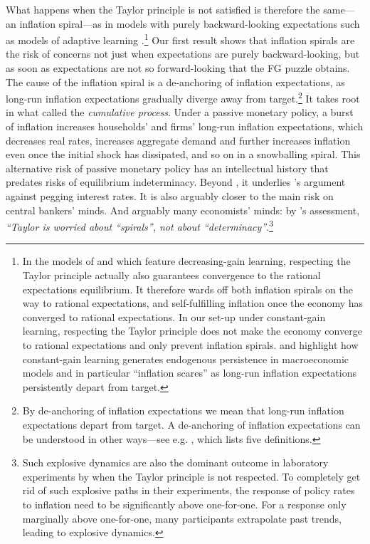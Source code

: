 \documentclass{article}
\begin{document}
What happens when the Taylor principle is not satisfied is therefore the same---an inflation spiral---as in models with purely backward-looking expectations such as models of adaptive learning \citep{BullardMitra2002,EvansHonkapohja2003, Preston2005}.\footnote{In the models of \cite{BullardMitra2002} and \cite{Preston2005} which feature decreasing-gain learning, respecting the Taylor principle actually also guarantees convergence to the rational expectations equilibrium. It therefore wards off both inflation spirals on the way to rational expectations, and self-fulfilling inflation once the economy has converged to rational expectations. In our set-up under constant-gain learning, respecting the Taylor principle does not make the economy converge to rational expectations and only prevent inflation spirals. \cite{OrphanidesWilliams2005} and \cite{Milani2007} highlight how constant-gain learning generates endogenous persistence in macroeconomic models and in particular ``inflation scares'' as long-run inflation expectations persistently depart from target.} Our first result shows that inflation spirals are the risk of concerns not just when expectations are purely backward-looking, but as soon as expectations are not so forward-looking that the FG puzzle obtains. The cause of the inflation spiral is a de-anchoring of inflation expectations, as long-run inflation expectations gradually diverge away from target.\footnote{By de-anchoring of inflation expectations we mean that long-run inflation expectations depart from target. A de-anchoring of inflation expectations can be understood in other ways---see e.g. \cite[][Section 2]{Kumaretal2015}, which lists five definitions.} It takes root in what \cite{Wicksell} called the \emph{cumulative process}. Under a passive monetary policy, a burst of inflation increases households' and firms' long-run inflation expectations, which decreases real rates, increases aggregate demand and further increases inflation even once the initial shock has dissipated, and so on in a snowballing spiral. This alternative risk of passive monetary policy has an intellectual history that predates risks of equilibrium indeterminacy. Beyond \cite{Wicksell}, it underlies \cite{Friedman1968}'s argument against pegging interest rates. It is also arguably closer to the main risk on central bankers' minds. And arguably many economists' minds: by \cite[][p.602]{Cochrane2011}'s assessment, \emph{``Taylor is worried about ``spirals'', not about ``determinacy''}.\footnote{Such explosive dynamics are also the dominant outcome in laboratory experiments by \cite{Assenzaetal2021} when the Taylor principle is not respected. To completely get rid of such explosive paths in their experiments, the response of policy rates to inflation need to be significantly above one-for-one. For a response only marginally above one-for-one, many participants extrapolate past trends, leading to explosive dynamics.}
\end{document}
